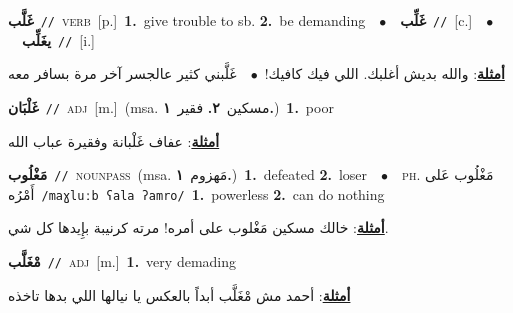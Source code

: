 \documentclass[10pt,a4paper,twoside]{article} %
\begin{document}
\begin{multicols}{2}
{\setlength\topsep{0pt}\textbf{\foreignlanguage{arabic}{غَلَّب}}\ {\color{gray}\texttt{//}\color{black}}\ \textsc{verb}\ [p.]\ \textbf{1.}~give trouble to sb.  \textbf{2.}~be demanding\ \ $\bullet$\ \ \setlength\topsep{0pt}\textbf{\foreignlanguage{arabic}{غَلِّب}}\ {\color{gray}\texttt{//}\color{black}}\ [c.]\ \ $\bullet$\ \ \setlength\topsep{0pt}\textbf{\foreignlanguage{arabic}{يغَلِّب}}\ {\color{gray}\texttt{//}\color{black}}\ [i.]\  \begin{flushright}\color{gray}\foreignlanguage{arabic}{\textbf{\underline{\foreignlanguage{arabic}{أمثلة}}}: والله بديش أغلبك. اللي فيك كافيك!\ $\bullet$\ \  غَلَّبني كثير عالجسر آخر مرة بسافر معه}\end{flushright}\color{black}} \vspace{2mm}

{\setlength\topsep{0pt}\textbf{\foreignlanguage{arabic}{غَلْبَان}}\ {\color{gray}\texttt{//}\color{black}}\ \textsc{adj}\ [m.]\ \color{gray}(msa. \foreignlanguage{arabic}{مسكين}~\foreignlanguage{arabic}{\textbf{٢.}}  \foreignlanguage{arabic}{فقير}~\foreignlanguage{arabic}{\textbf{١.}})\color{black}\ \textbf{1.}~poor\  \begin{flushright}\color{gray}\foreignlanguage{arabic}{\textbf{\underline{\foreignlanguage{arabic}{أمثلة}}}: عفاف غَلْبانة وفقيرة عباب الله}\end{flushright}\color{black}} \vspace{2mm}

{\setlength\topsep{0pt}\textbf{\foreignlanguage{arabic}{مَغْلُوب}}\ {\color{gray}\texttt{//}\color{black}}\ \textsc{noun\textunderscore pass}\ \color{gray}(msa. \foreignlanguage{arabic}{مَهزوم}~\foreignlanguage{arabic}{\textbf{١.}})\color{black}\ \textbf{1.}~defeated  \textbf{2.}~loser\ \ $\bullet$\ \ \textsc{ph.} \color{gray} \foreignlanguage{arabic}{مَغْلُوب عَلى أَمْرُه}\color{black}\ {\color{gray}\texttt{/{\sffamily maɣluːb ʕala ʔamro}/}\color{black}}\ \textbf{1.}~powerless  \textbf{2.}~can do nothing\  \begin{flushright}\color{gray}\foreignlanguage{arabic}{\textbf{\underline{\foreignlanguage{arabic}{أمثلة}}}: خالك مسكين مَغْلوب على أمره! مرته كرنيبة بإِيدها كل شي.}\end{flushright}\color{black}} \vspace{2mm}

{\setlength\topsep{0pt}\textbf{\foreignlanguage{arabic}{مْغَلَّب}}\ {\color{gray}\texttt{//}\color{black}}\ \textsc{adj}\ [m.]\ \textbf{1.}~very demading\  \begin{flushright}\color{gray}\foreignlanguage{arabic}{\textbf{\underline{\foreignlanguage{arabic}{أمثلة}}}: أحمد مش مْغَلَّب أبداً بالعكس يا نيالها اللي بدها تاخذه}\end{flushright}\color{black}} \vspace{2mm}


\end{multicols}
\end{document}
